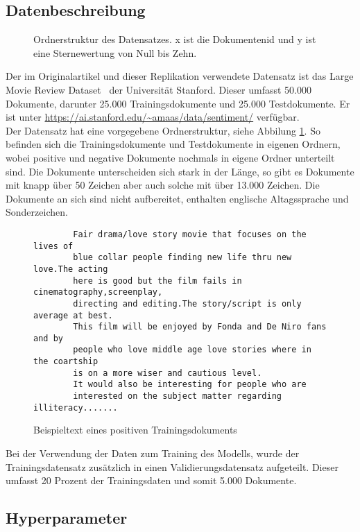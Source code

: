 \documentclass[DIV=13,fontsize=11pt]{scrartcl}
\begin{document}
\subsection{Datenbeschreibung}

\begin{figure}[H]
    \centering
    \begin{minipage}{5cm}
    \end{minipage}
    \caption{Ordnerstruktur des Datensatzes. x ist die Dokumentenid und y ist eine Sternewertung von Null bis Zehn.}
    \label{fig:filestruc}
\end{figure}

Der im Originalartikel und dieser Replikation verwendete Datensatz ist das Large Movie
Review Dataset~\cite{maas-EtAl:2011:ACL-HLT2011} der Universität Stanford.
Dieser umfasst 50.000 Dokumente, darunter 25.000 Trainingsdokumente und 25.000 Testdokumente. Er ist unter
\url{https://ai.stanford.edu/~amaas/data/sentiment/} verfügbar.\\

Der Datensatz hat eine vorgegebene Ordnerstruktur, siehe Abbilung \ref{fig:filestruc}.
So befinden sich die Trainingsdokumente und Testdokumente in eigenen Ordnern,
wobei positive und negative Dokumente nochmals in eigene Ordner unterteilt sind.
Die Dokumente unterscheiden sich stark in der Länge, so gibt es Dokumente mit knapp über 50 Zeichen
aber auch solche mit über 13.000 Zeichen.
Die Dokumente an sich sind nicht aufbereitet, enthalten englische Altagssprache und Sonderzeichen.

\begin{figure}[H]
    \centering
    \begin{lstlisting}
        Fair drama/love story movie that focuses on the lives of 
        blue collar people finding new life thru new love.The acting 
        here is good but the film fails in cinematography,screenplay,
        directing and editing.The story/script is only average at best.
        This film will be enjoyed by Fonda and De Niro fans and by 
        people who love middle age love stories where in the coartship 
        is on a more wiser and cautious level.
        It would also be interesting for people who are 
        interested on the subject matter regarding illiteracy.......
    \end{lstlisting}
    \caption{Beispieltext eines positiven Trainingsdokuments}
\end{figure}

Bei der Verwendung der Daten zum Training des Modells, wurde der Trainingsdatensatz zusätzlich in einen
Validierungsdatensatz aufgeteilt. Dieser umfasst 20 Prozent der Trainingsdaten und somit 5.000 Dokumente.

\subsection{Hyperparameter}
\end{document}
